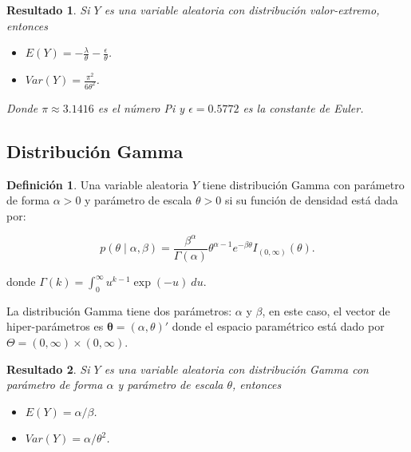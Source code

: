 \documentclass[
  10pt,
  spanish,
]{book}
\providecommand{\tightlist}{%
  \setlength{\itemsep}{0pt}\setlength{\parskip}{0pt}}
\newtheorem{proposition}{Resultado}[chapter]
\theoremstyle{definition}
\newtheorem{definition}{Definición}[chapter]
\theoremstyle{definition}
\theoremstyle{definition}
\theoremstyle{definition}
\theoremstyle{remark}
\begin{document}
\begin{proposition}
\protect\hypertarget{prp:unnamed-chunk-21}{}{\label{prp:unnamed-chunk-21} }Si \(Y\) es una variable aleatoria con distribución valor-extremo, entonces

\begin{itemize}
\tightlist
\item
  \(E(Y)=-\frac{\lambda}{\theta}-\frac{\epsilon}{\theta}\).
\item
  \(Var(Y)=\frac{\pi^2}{6\theta^2}\).
\end{itemize}

Donde \(\pi\approx 3.1416\) es el número Pi y \(\epsilon=0.5772\) es la constante de Euler.
\end{proposition}

\hypertarget{distribuciuxf3n-gamma}{%
\subsection{Distribución Gamma}\label{distribuciuxf3n-gamma}}

\begin{definition}
\protect\hypertarget{def:unnamed-chunk-22}{}{\label{def:unnamed-chunk-22} }Una variable aleatoria \(Y\) tiene distribución Gamma con parámetro de forma \(\alpha>0\) y parámetro de escala \(\theta>0\) si su función de densidad está dada por:

\begin{equation}
p(\theta \mid \alpha,\beta)=\frac{\beta^\alpha}{\Gamma(\alpha)}\theta^{\alpha-1} e^{-\beta\theta}I_{(0,\infty)}(\theta).
\end{equation}

donde \(\Gamma(k)=\int_0^{\infty}u^{k-1}\exp(-u)\ du\).
\end{definition}

La distribución Gamma tiene dos parámetros: \(\alpha\) y \(\beta\), en este caso, el vector de hiper-parámetros es \(\boldsymbol \theta=(\alpha,\theta)'\) donde el espacio paramétrico está dado por \(\Theta=(0,\infty)\times(0,\infty)\).

\begin{proposition}
\protect\hypertarget{prp:unnamed-chunk-23}{}{\label{prp:unnamed-chunk-23} }Si \(Y\) es una variable aleatoria con distribución Gamma con parámetro de forma \(\alpha\) y parámetro de escala \(\theta\), entonces

\begin{itemize}
\tightlist
\item
  \(E(Y)=\alpha/\beta\).
\item
  \(Var(Y)=\alpha/\theta^2\).
\end{itemize}
\end{proposition}
\end{document}
